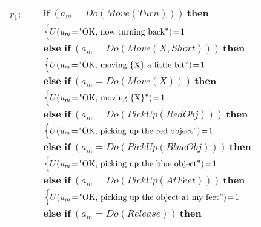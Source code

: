 \begin{footnotesize}
\begin{longtable}{p{2cm}l}
$r_{1}$: \ \ & $ \textbf{if} \ (\mathit{a_m}\!=\!\mathit{Do(Move(Turn))}) \ \textbf{then} $ \\
 & \;\;\;\;\; $ \begin{cases}U(\mathit{u_m}\!=\!\text{"OK, now turning back}")\!=\!1 \end{cases}$ \vspace{1mm} \\ & $ \textbf{else if} \ (\mathit{a_m}\!=\!\mathit{Do(Move({X},Short))}) \ \textbf{then}$ \\
& \;\;\;\;\; $ \begin{cases}U(\mathit{u_m}\!=\!\text{"OK, moving \{X\} a little bit}")\!=\!1 \end{cases}$ \vspace{1mm} \\ & $ \textbf{else if} \ (\mathit{a_m}\!=\!\mathit{Do(Move({X}))}) \ \textbf{then}$ \\
& \;\;\;\;\; $ \begin{cases}U(\mathit{u_m}\!=\!\text{"OK, moving \{X\}}")\!=\!1 \end{cases}$ \vspace{1mm} \\ & $ \textbf{else if} \ (\mathit{a_m}\!=\!\mathit{Do(PickUp(RedObj))}) \ \textbf{then}$ \\
& \;\;\;\;\; $ \begin{cases}U(\mathit{u_m}\!=\!\text{"OK, picking up the red object}")\!=\!1 \end{cases}$ \vspace{1mm} \\ & $ \textbf{else if} \ (\mathit{a_m}\!=\!\mathit{Do(PickUp(BlueObj))}) \ \textbf{then}$ \\
& \;\;\;\;\; $ \begin{cases}U(\mathit{u_m}\!=\!\text{"OK, picking up the blue object}")\!=\!1 \end{cases}$ \vspace{1mm} \\ & $ \textbf{else if} \ (\mathit{a_m}\!=\!\mathit{Do(PickUp(AtFeet))}) \ \textbf{then}$ \\
& \;\;\;\;\; $ \begin{cases}U(\mathit{u_m}\!=\!\text{"OK, picking up the object at my feet}")\!=\!1 \end{cases}$ \vspace{1mm} \\ & $ \textbf{else if} \ (\mathit{a_m}\!=\!\mathit{Do(Release)}) \ \textbf{then}$ \\

\end{longtable}
\end{footnotesize}

